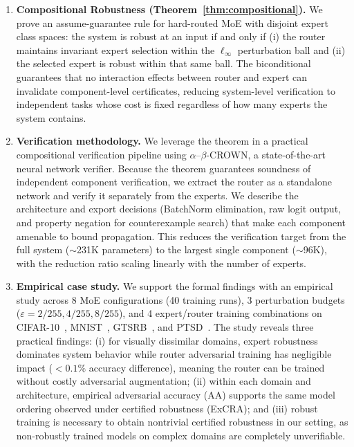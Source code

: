 \documentclass[runningheads]{llncs}
\begin{document}
\begin{enumerate}
    \item \textbf{Compositional Robustness (Theorem~\ref{thm:compositional}).} We prove an assume-guarantee rule for hard-routed MoE with disjoint expert class spaces: the system is robust at an input if and only if (i) the router maintains invariant expert selection within the $\ell_\infty$ perturbation ball and (ii) the selected expert is robust within that same ball. The biconditional guarantees that no interaction effects between router and expert can invalidate component-level certificates, reducing system-level verification to independent tasks whose cost is fixed regardless of how many experts the system contains.

    \item \textbf{Verification methodology.} We leverage the theorem in a practical compositional verification pipeline using $\alpha$--$\beta$-CROWN, a state-of-the-art neural network verifier. Because the theorem guarantees soundness of independent component verification, we extract the router as a standalone network and verify it separately from the experts. We describe the architecture and export decisions (BatchNorm elimination, raw logit output, and property negation for counterexample search) that make each component amenable to bound propagation. This reduces the verification target from the full system (${\sim}$231K parameters) to the largest single component (${\sim}$96K), with the reduction ratio scaling linearly with the number of experts.

    \item \textbf{Empirical case study.} We support the formal findings with an empirical study across 8 MoE configurations (40 training runs), 3 perturbation budgets ($\varepsilon = 2/255, 4/255, 8/255$), and 4 expert/router training combinations on CIFAR-10~\cite{cifar10}, MNIST~\cite{mnist1998}, GTSRB~\cite{gtsrb}, and PTSD~\cite{ptsd}. The study reveals three practical findings: (i) for visually dissimilar domains, expert robustness dominates system behavior while router adversarial training has negligible impact ($< 0.1\%$ accuracy difference), meaning the router can be trained without costly adversarial augmentation; (ii) within each domain and architecture, empirical adversarial accuracy (AA) supports the same model ordering observed under certified robustness (ExCRA); and (iii) robust training is necessary to obtain nontrivial certified robustness in our setting, as non-robustly trained models on complex domains are completely unverifiable.
\end{enumerate}
\end{document}
